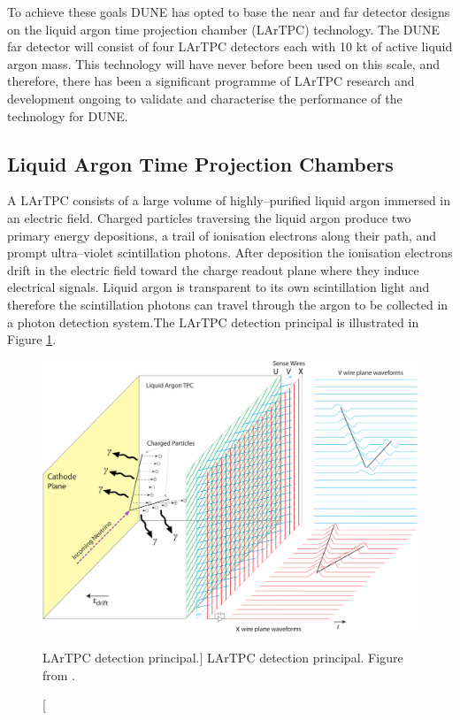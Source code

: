 To achieve these goals DUNE has opted to base the near and far detector designs
on the liquid argon time projection chamber (LArTPC) technology. The DUNE
far detector will consist of four LArTPC detectors each with 10 kt of active
liquid argon mass. This technology will have never before been used on this
scale, and therefore, there has been a significant programme of LArTPC research
and development ongoing to validate and characterise the performance of the 
technology for DUNE. 

\subsection{Liquid Argon Time Projection Chambers}
A LArTPC consists of a large volume of highly--purified liquid argon immersed in
an electric field. Charged particles traversing the liquid argon produce two
primary energy depositions, a trail of ionisation electrons along their path,
and prompt ultra--violet scintillation photons. After deposition the ionisation
electrons drift in the electric field toward the charge readout plane where they
induce electrical signals. Liquid argon is transparent to its own scintillation
light and therefore the scintillation photons can travel through the argon to be
collected in a photon detection system.The LArTPC detection principal is 
illustrated in Figure \ref{fig:lartpc}. 

\begin{figure}

	\centering

	\includegraphics[width=\textwidth]{figures/LArTPC_Concept.pdf}

	\caption
	[LArTPC detection principal.]
	{LArTPC detection principal. Figure from \cite{Abi:2020loh}.}

	\label{fig:lartpc}

\end{figure}


